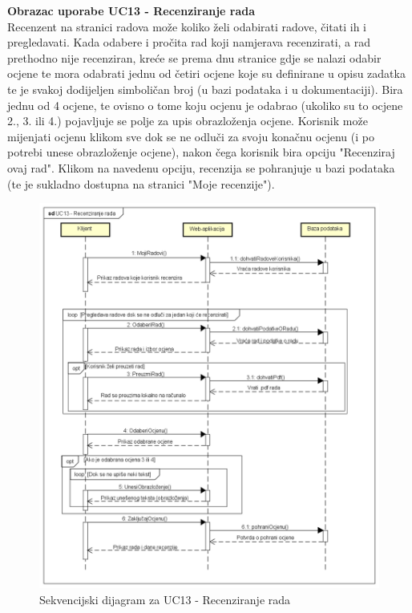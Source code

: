 				\eject
				
				\textbf{Obrazac uporabe UC13 - Recenziranje rada}\\
				Recenzent na stranici radova može koliko želi odabirati radove, čitati ih i pregledavati. Kada odabere i pročita rad koji namjerava recenzirati, a rad prethodno nije recenziran, kreće se prema dnu stranice gdje se nalazi odabir ocjene te mora odabrati jednu od četiri ocjene koje su definirane u opisu zadatka te je svakoj dodijeljen simboličan broj (u bazi podataka i u dokumentaciji). Bira jednu od 4 ocjene, te ovisno o tome koju ocjenu je odabrao (ukoliko su to ocjene 2., 3. ili 4.) pojavljuje se polje za upis obrazloženja ocjene. Korisnik može mijenjati ocjenu klikom sve dok se ne odluči za svoju konačnu ocjenu (i po potrebi unese obrazloženje ocjene), nakon čega korisnik bira opciju "Recenziraj ovaj rad". Klikom na navedenu opciju, recenzija se pohranjuje u bazi podataka (te je sukladno dostupna na stranici "Moje recenzije").
				\eject

				\begin{figure}[H]
					\includegraphics[scale=0.58]{dijagrami/UC13-RecenziranjeRada.png} 
					\centering
					\caption{Sekvencijski dijagram za UC13 - Recenziranje rada}
					\label{fig:sekvencijski2}
				\end{figure}


